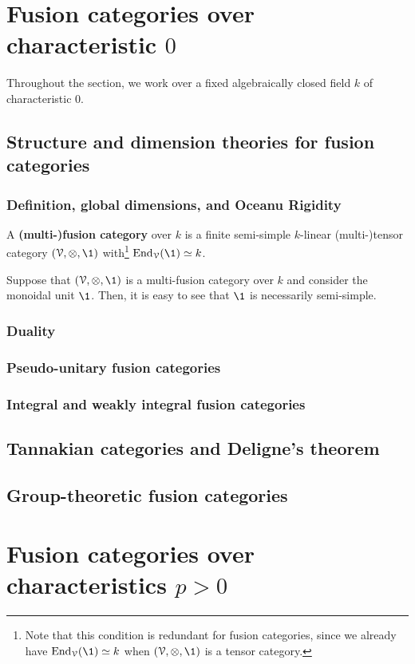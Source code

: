 \section{Fusion categories over characteristic \texorpdfstring{$0$}{}}
    \begin{convention}
        Throughout the section, we work over a fixed algebraically closed field $k$ of characteristic $0$.
    \end{convention}

    \subsection{Structure and dimension theories for fusion categories}
        \subsubsection{Definition, global dimensions, and Oceanu Rigidity}
            \begin{definition} \label{def: fusion_categories}
                A \textbf{(multi-)fusion category} over $k$ is a finite semi-simple $k$-linear (multi-)tensor category $(\calV, \tensor, \1)$ with\footnote{Note that this condition is redundant for fusion categories, since we already have $\End_{\calV}(\1) \cong k$ when $(\calV, \tensor, \1)$ is a tensor category.} $\End_{\calV}(\1) \cong k$.
            \end{definition}
            \begin{remark} \label{remark: semi_simplicity_of_monoidal_units_of_multi_fusion_categories}
                Suppose that $(\calV, \tensor, \1)$ is a multi-fusion category over $k$ and consider the monoidal unit $\1$. Then, it is easy to see that $\1$ is necessarily semi-simple. 
            \end{remark}
            
        \subsubsection{Duality}
        
        \subsubsection{Pseudo-unitary fusion categories}
        
        \subsubsection{Integral and weakly integral fusion categories}

    \subsection{Tannakian categories and Deligne's theorem}
    
    \subsection{Group-theoretic fusion categories}
    
\section{Fusion categories over characteristics \texorpdfstring{$p > 0$}{}}